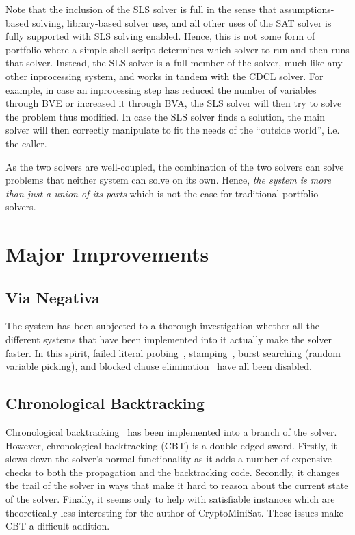 \documentclass[final]{ieee}
\begin{document}
Note that the inclusion of the SLS solver is full in the sense that assumptions-based solving, library-based solver use, and all other uses of the SAT solver is fully supported with SLS solving enabled. Hence, this is not some form of portfolio where a simple shell script determines which solver to run and then runs that solver. Instead, the SLS solver is a full member of the solver, much like any other inprocessing system, and works in tandem with the CDCL solver. For example, in case an inprocessing step has reduced the number of variables through BVE or increased it through BVA, the SLS solver will then try to solve the problem thus modified. In case the SLS solver finds a solution, the main solver will then correctly manipulate to fit the needs of the ``outside world'', i.e. the caller.

As the two solvers are well-coupled, the combination of the two solvers can solve problems that neither system can solve on its own. Hence, \emph{the system is more than just a union of its parts} which is not the case for traditional portfolio solvers.

\section{Major Improvements}
\subsection{Via Negativa}
The system has been subjected to a thorough investigation whether all the different systems that have been implemented into it actually make the solver faster. In this spirit, failed literal probing~\cite{DBLP:conf/ictai/LynceS03}, stamping~\cite{stamping}, burst searching (random variable picking), and blocked clause elimination~\cite{TACAS-2010-JarvisaloBH} have all been disabled.

\subsection{Chronological Backtracking}
Chronological backtracking~\cite{chronobt} has been implemented into a branch of the solver. However, chronological backtracking (CBT) is a double-edged sword. Firstly, it slows down the solver's normal functionality as it adds a number of expensive checks to both the propagation and the backtracking code. Secondly, it changes the trail of the solver in ways that make it hard to reason about the current state of the solver. Finally, it seems only to help with satisfiable instances which are theoretically less interesting for the author of CryptoMiniSat. These issues make CBT a difficult addition.
\end{document}

